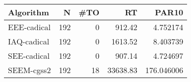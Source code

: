 \begin{tabular}{lrrrr}
\toprule
  Algorithm &   N &  \#TO &       RT &      PAR10 \\
\midrule
EEE-cadical & 192 &    0 &   912.42 &   4.752174 \\
IAQ-cadical & 192 &    0 &  1613.52 &   8.403739 \\
SEE-cadical & 192 &    0 &   907.14 &   4.724697 \\
 SEEM-cgss2 & 192 &   18 & 33638.83 & 176.046006 \\
\bottomrule
\end{tabular}
